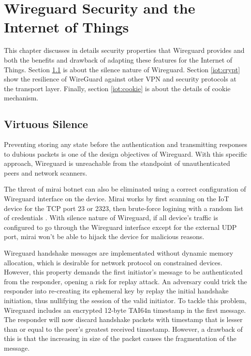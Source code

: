 \chapter{Wireguard Security and the Internet of Things}
  This chapter discusses in details security properties that Wireguard provides and both the benefits
  and drawback of adapting these features for the Internet of Things. Section \ref{iot:silence} is
  about the silence nature of Wireguard. Section \ref{iot:crypt} show the resilience of WireGuard
  against other VPN and security protocols at the transport layer. Finally, section \ref{iot:cookie} is about the details of 
  cookie mechanism. 
\section{Virtuous Silence} \label{iot:silence}
  Preventing storing any state before the authentication and transmitting responses to dubious packets
  is one of the design objectives of Wireguard. With this specific approach, Wireguard is unreachable
  from the standpoint of unauthenticated peers and network scanners. 

  The threat of mirai botnet can also be eliminated using a correct configuration of 
  Wireguard interface on the device. Mirai works by first scanning on the IoT device for
  the TCP port 23 or 2323, then brute-force logining with a random list of credentials \cite{botnet}.
  With silence nature of Wireguard, if all device's traffic is configured to go through the
  Wireguard interface except for the external UDP port, mirai won't be able to hijack the
  device for malicious reasons.

  Wireguard handshake messages are implementated without dynamic memory allocation, which is
  desirable for network protocol on constrained devices. However, this property demands the
  first initiator's message to be authenticated  from the responder, opening a risk for
  replay attack. An adversary could trick the responder into re-creating its ephemeral key
  by replay the initial handshake initiation, thus nullifying the session of the valid initiator.
  To tackle this problem, Wireguard includes an encrypted 12-byte TAI64n \cite{tai64} timestamp 
  in the first message. The responder will now discard handshake packets with timestamp that 
  is lesser than or equal to the peer's greatest received timestamp. However, a drawback of 
  this is that the increasing in size of the packet causes the fragmentation of the message.
